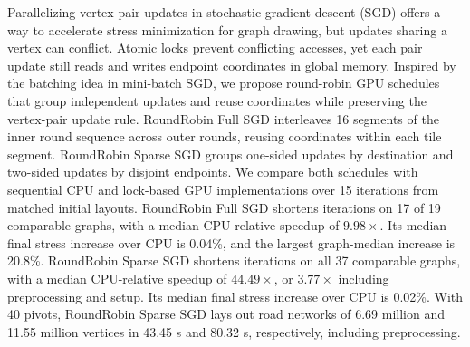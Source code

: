 Parallelizing vertex-pair updates in stochastic gradient descent (SGD) offers a way to accelerate stress minimization for graph drawing, but updates sharing a vertex can conflict.
Atomic locks prevent conflicting accesses, yet each pair update still reads and writes endpoint coordinates in global memory.
Inspired by the batching idea in mini-batch SGD, we propose round-robin GPU schedules that group independent updates and reuse coordinates while preserving the vertex-pair update rule.
RoundRobin Full SGD interleaves 16 segments of the inner round sequence across outer rounds, reusing coordinates within each tile segment. RoundRobin Sparse SGD groups one-sided updates by destination and two-sided updates by disjoint endpoints.
We compare both schedules with sequential CPU and lock-based GPU implementations over 15 iterations from matched initial layouts.
RoundRobin Full SGD shortens iterations on 17 of 19 comparable graphs, with a median CPU-relative speedup of $9.98\times$. Its median final stress increase over CPU is 0.04\%, and the largest graph-median increase is 20.8\%.
RoundRobin Sparse SGD shortens iterations on all 37 comparable graphs, with a median CPU-relative speedup of $44.49\times$, or $3.77\times$ including preprocessing and setup. Its median final stress increase over CPU is 0.02\%.
With 40 pivots, RoundRobin Sparse SGD lays out road networks of 6.69 million and 11.55 million vertices in 43.45 s and 80.32 s, respectively, including preprocessing.
